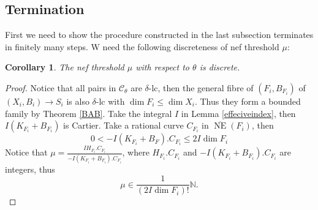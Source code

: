 \documentclass{article}
\newtheorem{cor}[defn]{Corollary}
\begin{document}
\subsection{Termination}
First we need to show the procedure constructed in the last subsection terminates in finitely many steps. W need the following discreteness of nef threshold  $\mu$:
\begin{cor}\label{Discreteness}
  The nef threshold $ \mu $ with respect to $ \theta $ is discrete.
\end{cor}
\begin{proof}
  Notice that all pairs in $ \mathcal{C}_\theta $ are $ \delta $-lc, then the general fibre  of $(F_{i},B_{F_{i}})$ of  $(X_{i},B_{i})\to S_{i}$ is  also $\delta$-lc with $\dim F_{i}\leqslant \dim X_{i}$. Thus they form a bounded family by Theorem \ref{BAB}. Take the integral $ I $ in  Lemma \ref{effeciveindex}, then $ I(K_{F_{i}}+B_{F_{i}}) $ is Cartier. Take a rational curve $ C_{F_{i}} $ in $ \overline{\operatorname{NE}}(F_{i}) $, then
  \[ 0<-I(K_{F_{i}}+B_{F}).C_{F_{i}}\leqslant 2I\dim F_{i} \]
  Notice that $ \mu=\frac{IH_{F_{i}}.C_{F_{i}}}{-I(K_{F_{i}}+B_{F_{i}}).C_{F_{i}}} $, where $ H_{F_{i}}.C_{F_{i}} $ and $ -I(K_{F_{i}}+B_{F_{i}}).C_{F_{i}} $ are integers, thus 
  \[ \mu\in \frac{1}{(2I\dim F_{i})!}\mathbb{N}.  \] \end{proof}
\end{document}
